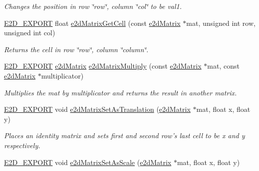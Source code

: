 \begin{DoxyCompactItemize}
\begin{DoxyCompactList}\small\item\em Changes the position in row \char`\"{}row\char`\"{}, column \char`\"{}col\char`\"{} to be val1. \end{DoxyCompactList}\item 
\hyperlink{Ez2DS_8h_a9f14e9cb869e1a85fdaba03afcca0df9}{E2\-D\-\_\-\-E\-X\-P\-O\-R\-T} float \hyperlink{group__e2dMatrix_ga3c2303c60ffdcd113db5ba333920a33a}{e2d\-Matrix\-Get\-Cell} (const \hyperlink{structe2dMatrix}{e2d\-Matrix} $\ast$mat, unsigned int row, unsigned int col)
\begin{DoxyCompactList}\small\item\em Returns the cell in row \char`\"{}row\char`\"{}, column \char`\"{}column\char`\"{}. \end{DoxyCompactList}\item 
\hyperlink{Ez2DS_8h_a9f14e9cb869e1a85fdaba03afcca0df9}{E2\-D\-\_\-\-E\-X\-P\-O\-R\-T} \hyperlink{structe2dMatrix}{e2d\-Matrix} \hyperlink{group__e2dMatrix_ga16ea095d1f2bd0c92d188f328542ae62}{e2d\-Matrix\-Multiply} (const \hyperlink{structe2dMatrix}{e2d\-Matrix} $\ast$mat, const \hyperlink{structe2dMatrix}{e2d\-Matrix} $\ast$multiplicator)
\begin{DoxyCompactList}\small\item\em Multiplies the mat by multiplicator and returns the result in another matrix. \end{DoxyCompactList}\item 
\hypertarget{group__e2dMatrix_ga7a3ec70e382f6ad15b6d97455599a9b5}{\hyperlink{Ez2DS_8h_a9f14e9cb869e1a85fdaba03afcca0df9}{E2\-D\-\_\-\-E\-X\-P\-O\-R\-T} void \hyperlink{group__e2dMatrix_ga7a3ec70e382f6ad15b6d97455599a9b5}{e2d\-Matrix\-Set\-As\-Translation} (\hyperlink{structe2dMatrix}{e2d\-Matrix} $\ast$mat, float x, float y)}\label{group__e2dMatrix_ga7a3ec70e382f6ad15b6d97455599a9b5}

\begin{DoxyCompactList}\small\item\em Places an identity matrix and sets first and second row's last cell to be x and y respectively. \end{DoxyCompactList}\item 
\hypertarget{group__e2dMatrix_ga7b76afea41c7d5cbaa611477a6fe2c0d}{\hyperlink{Ez2DS_8h_a9f14e9cb869e1a85fdaba03afcca0df9}{E2\-D\-\_\-\-E\-X\-P\-O\-R\-T} void \hyperlink{group__e2dMatrix_ga7b76afea41c7d5cbaa611477a6fe2c0d}{e2d\-Matrix\-Set\-As\-Scale} (\hyperlink{structe2dMatrix}{e2d\-Matrix} $\ast$mat, float x, float y)}\label{group__e2dMatrix_ga7b76afea41c7d5cbaa611477a6fe2c0d}


\end{DoxyCompactItemize}
